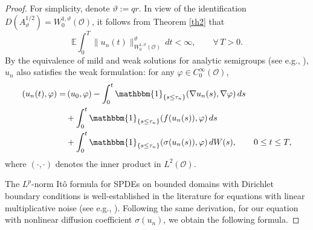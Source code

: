\documentclass[10pt]{article}
\numberwithin{figure}{section}
\numberwithin{equation}{section}
\newcommand{\0}{{\theta}}
\def\va{\varphi}
\begin{document}

\begin{proof} For simplicity, denote $\vartheta:=qr$.
In view of the identification $D(A_\vartheta^{1/2})=W_0^{1,\vartheta}(\mathcal O)$, it follows from Theorem \ref{th2} that
$$
\mathbb{E}\int_0^T \|u_n(t)\|_{W_0^{1,\vartheta}(\mathcal O)}^\vartheta\,dt < \infty,\qquad \forall\, T>0.
$$
By the equivalence of mild and weak solutions for analytic semigroups (see e.g., \cite[Theorem 6.5]{DZ}), $u_n$ also satisfies the weak formulation: for any $\varphi \in C_0^\infty(\mathcal O)$,
\begin{equation*}
\begin{aligned}
(u_n(t), \varphi) =&\, (u_0, \varphi) 
                     - \int_0^t \mathbbm{1}_{\{s \le\tau_n\}} (\nabla u_n(s),\nabla\va)\, ds \\
                   &+ \int_0^t \mathbbm{1}_{\{s \le\tau_n\}} (f(u_n(s)), \varphi) \, ds \\
                   &+ \int_0^t \mathbbm{1}_{\{s \le\tau_n\}} (\sigma(u_n(s)), \varphi) \, dW(s), \qquad 0 \le t \le T,
\end{aligned}
\end{equation*}
where $(\cdot,\cdot)$ denotes the inner product in $L^2(\mathcal O)$.

The $L^p$-norm It\^o formula for SPDEs on bounded domains with Dirichlet boundary conditions is well-established in the literature for equations with linear multiplicative noise (see e.g., \cite[Lemma 3.3]{DG15}). Following the same derivation, for our equation with nonlinear diffusion coefficient $\sigma(u_n)$, we obtain the following formula.


\end{proof}
\end{document}
